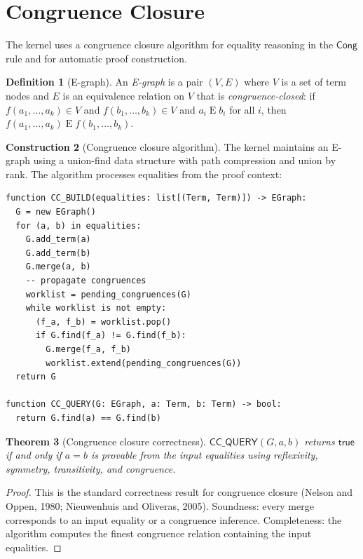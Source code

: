 \documentclass[11pt,a4paper]{report}
\theoremstyle{definition}
\newtheorem{definition}{Definition}[chapter]
\newtheorem{construction}[definition]{Construction}
\theoremstyle{plain}
\newtheorem{theorem}[definition]{Theorem}
\newcommand{\Cong}{\mathsf{Cong}}
\begin{document}
\section{Congruence Closure}
\label{sec:congruence-closure}

The kernel uses a congruence closure algorithm for equality reasoning
in the $\Cong$ rule and for automatic proof construction.

\begin{definition}[E-graph]
\label{def:egraph}
An \emph{E-graph} is a pair $(V, E)$ where $V$ is a set of term nodes and
$E$ is an equivalence relation on $V$ that is \emph{congruence-closed}:
if $f(a_1, \ldots, a_k) \in V$ and $f(b_1, \ldots, b_k) \in V$ and
$a_i \mathrel{E} b_i$ for all $i$, then
$f(a_1, \ldots, a_k) \mathrel{E} f(b_1, \ldots, b_k)$.
\end{definition}

\begin{construction}[Congruence closure algorithm]
\label{con:cc-algorithm}
The kernel maintains an E-graph using a union-find data structure with
path compression and union by rank. The algorithm processes equalities
from the proof context:
\begin{lstlisting}[style=proof]
function CC_BUILD(equalities: list[(Term, Term)]) -> EGraph:
  G = new EGraph()
  for (a, b) in equalities:
    G.add_term(a)
    G.add_term(b)
    G.merge(a, b)
    -- propagate congruences
    worklist = pending_congruences(G)
    while worklist is not empty:
      (f_a, f_b) = worklist.pop()
      if G.find(f_a) != G.find(f_b):
        G.merge(f_a, f_b)
        worklist.extend(pending_congruences(G))
  return G

function CC_QUERY(G: EGraph, a: Term, b: Term) -> bool:
  return G.find(a) == G.find(b)
\end{lstlisting}
\end{construction}

\begin{theorem}[Congruence closure correctness]
$\mathsf{CC\_QUERY}(G, a, b)$ returns $\mathsf{true}$ if and only if
$a = b$ is provable from the input equalities using reflexivity,
symmetry, transitivity, and congruence.
\end{theorem}
\begin{proof}
This is the standard correctness result for congruence closure
(Nelson and Oppen, 1980; Nieuwenhuis and Oliveras, 2005). Soundness:
every merge corresponds to an input equality or a congruence inference.
Completeness: the algorithm computes the finest congruence relation
containing the input equalities.
\end{proof}
\end{document}
